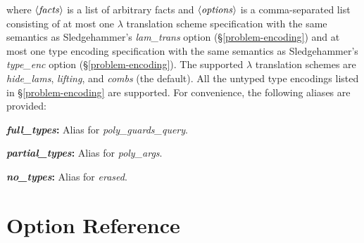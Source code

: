 \documentclass[a4paper,12pt]{article}
\def\qty#1{\ensuremath{\left<\mathit{#1\/}\right>}}
\begin{document}
where \qty{facts} is a list of arbitrary facts and \qty{options} is a
comma-separated list consisting of at most one $\lambda$ translation scheme
specification with the same semantics as Sledgehammer's \textit{lam\_trans}
option (\S\ref{problem-encoding}) and at most one type encoding specification
with the same semantics as Sledgehammer's \textit{type\_enc} option
(\S\ref{problem-encoding}).
%
The supported $\lambda$ translation schemes are \textit{hide\_lams},
\textit{lifting}, and \textit{combs} (the default).
%
All the untyped type encodings listed in \S\ref{problem-encoding} are supported.
For convenience, the following aliases are provided:
\begin{enum}
\item[\labelitemi] \textbf{\textit{full\_types}:} Alias for \textit{poly\_guards\_query}.
\item[\labelitemi] \textbf{\textit{partial\_types}:} Alias for \textit{poly\_args}.
\item[\labelitemi] \textbf{\textit{no\_types}:} Alias for \textit{erased}.
\end{enum}

\section{Option Reference}
\label{option-reference}

\def\defl{\{}
\def\defr{\}}
\end{document}
